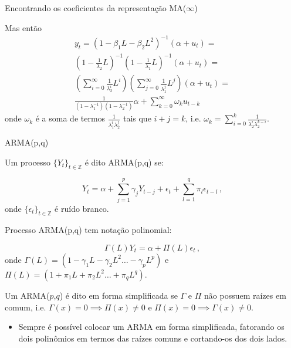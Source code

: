 \documentclass[11pt]{beamer}
\newenvironment{halfwideitemize}{\itemize\addtolength{\itemsep}{0.5em}}{\enditemize}
\begin{document}
\begin{frame}{Encontrando os coeficientes da representação MA($\infty$)}
	\begin{halfwideitemize}
		\item Mas então 
		\begin{equation}
			\begin{aligned}
				y_t = (1-\beta_1 L - \beta_2 L^2)^{-1}(\alpha + u_t) = \\ \left(1-\frac{1}{\lambda_2}L\right)^{-1}\left(1- \frac{1}{\lambda_1}L\right)^{-1}(\alpha+u_t) = \\
				 \left(\sum_{i=0}^\infty \frac{1}{\lambda_2^i} L^i\right) \left(\sum_{j=0}^\infty \frac{1}{\lambda_1^j}L^j\right)(\alpha + u_t) =\\
				 \frac{1}{(1-\lambda_1^{-1})(1-\lambda_2^{-1})}\alpha + \sum_{k=0}^\infty \omega_k u_{t-k} \end{aligned}
		\end{equation}
		onde $\omega_k$ é a soma de termos $\frac{1}{\lambda^i_1 \lambda^j_2}$ tais que $i+j=k$, i.e. $\omega_k = \sum_{i=0}^k \frac{1}{\lambda^i_2 \lambda^{k-i}_2}$.
	\end{halfwideitemize}
\end{frame}

\begin{frame}{ARMA(p,q)}
	
	\begin{halfwideitemize}
		\item Um processo $\{Y_t\}_{t \in \mathbb{Z}}$ é dito ARMA(p,q) se:
		
		$$Y_t = \alpha + \sum_{j=1}^p \gamma_j Y_{t-j} + \epsilon_t + \sum_{l=1}^q \pi_l \epsilon_{t-l} \, ,$$
		onde $\{\epsilon_t\}_{t \in \mathbb{Z}}$ é ruído branco.
		
		\item Processo ARMA(p,q) tem notação polinomial:
		
		$$\Gamma(L)Y_t = \alpha + \Pi(L)\epsilon_t \, ,$$
		onde $\Gamma(L) = (1-\gamma_1L -\gamma_2 L^2 \ldots -\gamma_p L^p)$ e $\Pi(L) = (1+\pi_1L +\pi_2 L^2 \ldots +\pi_q L^q)$.
			\item Um ARMA($p$,$q$) é dito em {\color{blue}forma simplificada} se $\Gamma$ e $\Pi$ não possuem raízes em comum, i.e. $\Gamma(x) =0 \implies \Pi(x) \neq 0$ e $\Pi(x) = 0 \implies \Gamma(x) \neq 0$.
		
		\begin{itemize}
			\item Sempre é possível colocar um ARMA em forma simplificada, fatorando os dois polinômios em termos das raízes comuns e cortando-os dos dois lados.
		\end{itemize}
	
	\end{halfwideitemize}
\end{frame}
\end{document}
